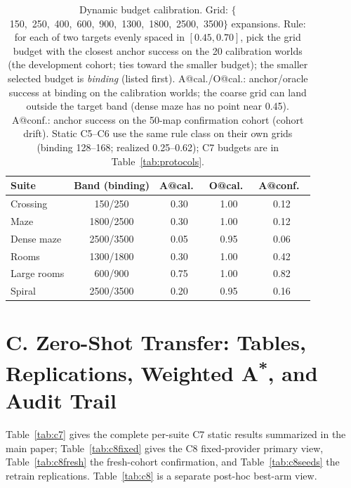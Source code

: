 \documentclass[letterpaper]{article} %
\newcommand{\stage}[1]{\textsc{#1}}
\begin{document}
\begin{table}[t]
\centering
\small
\setlength{\tabcolsep}{2.6pt}
\begin{tabular}{@{}lcccc@{}}
\toprule
Suite & Band (binding) & A@cal.\ & O@cal.\ & A@conf.\ \\
\midrule
Crossing & 150/250 & 0.30 & 1.00 & 0.12 \\
Maze & 1800/2500 & 0.30 & 1.00 & 0.12 \\
Dense maze & 2500/3500 & 0.05 & 0.95 & 0.06 \\
Rooms & 1300/1800 & 0.30 & 1.00 & 0.42 \\
Large rooms & 600/900 & 0.75 & 1.00 & 0.82 \\
Spiral & 2500/3500 & 0.20 & 0.95 & 0.16 \\
\bottomrule
\end{tabular}
\caption{Dynamic budget calibration. Grid: $\{$150,\allowbreak\ 250,\allowbreak\ 400,\allowbreak\ 600,\allowbreak\ 900,\allowbreak\ 1300,\allowbreak\ 1800,\allowbreak\ 2500,\allowbreak\ 3500$\}$ expansions. Rule: for each of two targets evenly spaced in $[0.45, 0.70]$, pick the grid budget with the closest anchor success on the 20 calibration worlds (the development cohort; ties toward the smaller budget); the smaller selected budget is \emph{binding} (listed first). A@cal./O@cal.: anchor/oracle success at binding on the calibration worlds; the coarse grid can land outside the target band (dense maze has no point near 0.45). A@conf.: anchor success on the 50-map confirmation cohort (cohort drift). Static \stage{C5}--\stage{C6} use the same rule class on their own grids (binding 128--168; realized 0.25--0.62); \stage{C7} budgets are in Table~\ref{tab:protocols}.}
\label{tab:calib}
\end{table}

\clearpage
\section{C. Zero-Shot Transfer: Tables, Replications, Weighted A\textsuperscript{*}, and Audit Trail}

Table~\ref{tab:c7} gives the complete per-suite \stage{C7} static results summarized in the main paper; Table~\ref{tab:c8fixed} gives the \stage{C8} fixed-provider primary view, Table~\ref{tab:c8fresh} the fresh-cohort confirmation, and Table~\ref{tab:c8seeds} the retrain replications. Table~\ref{tab:c8} is a separate post-hoc best-arm view.
\end{document}
